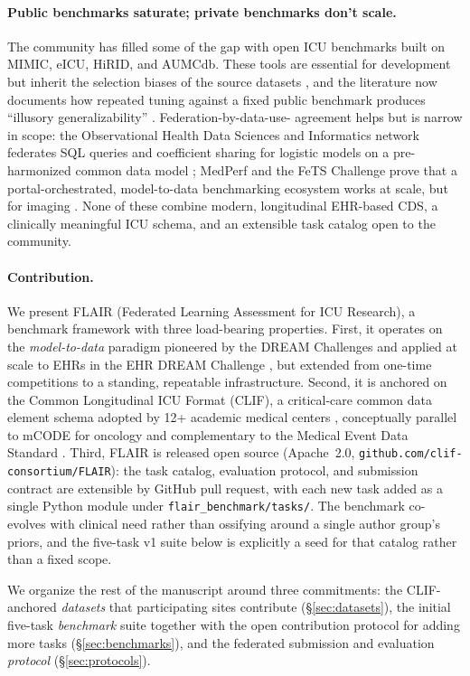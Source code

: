 \paragraph{Public benchmarks saturate; private benchmarks don't scale.}
The community has filled some of the gap with open ICU benchmarks
\citep{vandewater2023yaib,yeche2021hirid} built on MIMIC, eICU, HiRID,
and AUMCdb. These tools are essential for development but inherit the
selection biases of the source datasets \citep{roosli2022mimicfairness},
and the literature now documents how repeated tuning against a fixed
public benchmark produces ``illusory generalizability''
\citep{recht2019imagenet,chekroud2024illusory}. Federation-by-data-use-
agreement helps but is narrow in scope: the Observational Health Data
Sciences and Informatics network federates SQL queries and coefficient
sharing for logistic models on a pre-harmonized common data model
\citep{reps2020ohdsistroke}; MedPerf and the FeTS Challenge prove that
a portal-orchestrated, model-to-data benchmarking ecosystem works at
scale, but for imaging \citep{karargyris2023medperf,pati2022fets}. None
of these combine modern, longitudinal EHR-based CDS, a clinically
meaningful ICU schema, and an extensible task catalog open to the
community.

\paragraph{Contribution.}
We present FLAIR (Federated Learning Assessment for ICU Research), a
benchmark framework with three load-bearing properties. First, it
operates on the \emph{model-to-data} paradigm pioneered by the DREAM
Challenges and applied at scale to EHRs in the EHR DREAM Challenge
\citep{guinney2018dream,bergquist2024ehrdream}, but extended from
one-time competitions to a standing, repeatable infrastructure.
Second, it is anchored on the Common Longitudinal ICU Format (CLIF), a
critical-care common data element schema adopted by 12+ academic
medical centers \citep{rojas2025clif}, conceptually parallel to mCODE
for oncology \citep{mcode2024hl7} and complementary to the Medical
Event Data Standard \citep{arnrich2025meds}. Third, FLAIR is released open source (Apache~2.0,
\texttt{github.com/clif-consortium/FLAIR}): the task catalog,
evaluation protocol, and submission contract are extensible by
GitHub pull request, with each new task added as a single Python
module under \texttt{flair\_benchmark/tasks/}. The benchmark
co-evolves with clinical need rather than ossifying around a single
author group's priors, and the five-task v1 suite below is
explicitly a seed for that catalog rather than a fixed scope.

We organize the rest of the manuscript around three commitments: the
CLIF-anchored \emph{datasets} that participating sites contribute
(\S\ref{sec:datasets}), the initial five-task \emph{benchmark} suite
together with the open contribution protocol for adding more tasks
(\S\ref{sec:benchmarks}), and the federated submission and evaluation
\emph{protocol} (\S\ref{sec:protocols}).
